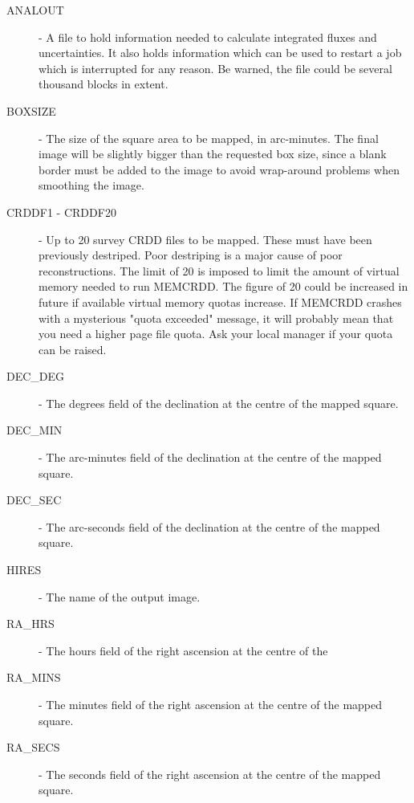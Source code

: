 \begin {description}

\item [ANALOUT] - A file to hold information needed to calculate integrated
fluxes  and uncertainties. It also holds information which can be used to
restart a job  which is interrupted for any reason. Be warned, the file could
be several  thousand blocks in extent.

\item [BOXSIZE] - The size of the square area to be mapped, in arc-minutes. The
final image will be slightly bigger than the requested box size, since a blank
border must be added to the image to avoid wrap-around problems when smoothing
the image.

\item  [CRDDF1 - CRDDF20] - Up to 20 survey CRDD files to be mapped. These must
have been previously destriped. Poor destriping is a major cause of poor
reconstructions. The limit of 20 is imposed to limit the amount of virtual
memory needed to run MEMCRDD. The figure of 20 could be increased in future
if available virtual memory quotas increase. If MEMCRDD crashes with a
mysterious "quota exceeded" message, it will probably mean that you need a
higher page file quota. Ask your local manager if your quota can be raised.

\item [DEC\_DEG] - The degrees field of the declination at the centre of the
mapped square.

\item [DEC\_MIN] - The arc-minutes field of the declination at the centre of
the  mapped square.

\item [DEC\_SEC] - The arc-seconds field of the declination at the centre of
the  mapped square.

\item [HIRES] - The name of the output image.

\item [RA\_HRS] - The hours field of the right ascension at the centre of the

\item [RA\_MINS] - The minutes field of the right ascension at the centre of the
mapped square.

\item [RA\_SECS] - The seconds field of the right ascension at the centre of
the  mapped square.

\end {description}

